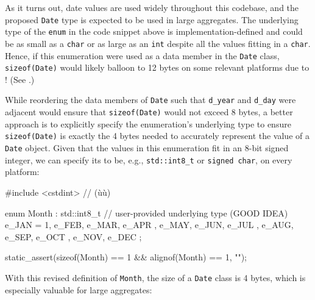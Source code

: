 %

\noindent As it turns out, date values are used widely throughout this codebase,
and the proposed \lstinline!Date! type is expected to be used in large
aggregates. The underlying type of the \lstinline!enum! in the code snippet
above is implementation-defined and could be as small as a \lstinline!char!
or as large as an \lstinline!int! despite all the values fitting in a
\lstinline!char!. Hence, if this enumeration were used as a data member in
the \lstinline!Date! class, \lstinline!sizeof(Date)! would likely balloon to
12 bytes on some relevant platforms due to !
(See .)

While reordering the data members of \lstinline!Date! such that \lstinline!d_year! and
\lstinline!d_day! were adjacent would ensure that \lstinline!sizeof(Date)!
would not exceed 8 bytes, a better approach is to explicitly specify the
enumeration's underlying type to ensure \lstinline!sizeof(Date)! is exactly
the 4 bytes needed to accurately represent the value of a
\lstinline!Date! object. Given that the values in this enumeration fit in
an 8-bit signed integer, we can specify its  to
be, e.g., \lstinline!std::int8_t! or \lstinline!signed!~\lstinline!char!, on
every platform:

\begin{emcppslisting}
#include <cstdint>  // (ù{}ù)

enum Month : std::int8_t  // user-provided underlying type (GOOD IDEA)
{
    e_JAN = 1, e_FEB, e_MAR,   
    e_APR    , e_MAY, e_JUN,   
    e_JUL    , e_AUG, e_SEP,   
    e_OCT    , e_NOV, e_DEC     
};

static_assert(sizeof(Month) == 1 && alignof(Month) == 1, "");
\end{emcppslisting}

\noindent With this revised definition of \lstinline!Month!, the size of a
\lstinline!Date! class is 4 bytes, which is especially valuable for large
aggregates:

